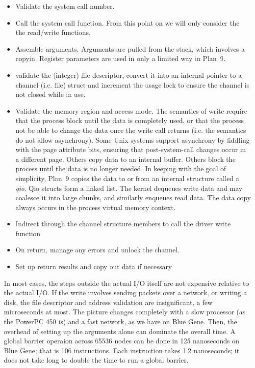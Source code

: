 \documentclass[a4,10pt,preprint]{sigplanconf}
\begin{document}
\begin{itemize}
\item Validate the system call number.
\item Call the system call function. From this point on we will only consider the the read/write functions. 
\item Assemble arguments. Arguments are pulled from the stack, which involves a copyin. Register parameters are used in only a limited way in Plan~9. 
\item validate the (integer) file descriptor, convert it into an internal pointer to a channel (i.e. file) struct and increment the usage lock to ensure the channel is not closed while in use. 
\item Validate the memory region and access mode. The semantics of write require that the process block 
until the data is completely used, or that the process not be able to change the data once the write call returns (i.e. 
the semantics do not allow asynchrony). Some Unix systems support asynchrony by fiddling with the 
page attribute bits, ensuring that post-system-call changes occur in a different page. Others copy data to an internal buffer. Others block the process until the data is no longer needed. 
In keeping with the goal of simplicity, Plan~9 copies the data to or from an internal structure called a {\em qio}. Qio structs form a linked list. The kernel dequeues write data and may coalesce it into large chunks, and similarly enqueues read data. The data copy always occurs in the process virtual memory context. 
\item Indirect through the channel structure members to call the driver write function
\item On return, manage any errors and unlock the channel. 
\item Set up return results and copy out data if necessary
\end{itemize}

In most cases, the steps outside the actual I/O itself are not expensive relative to the actual I/O. If the write involves
sending packets over a network, or writing a disk, the file descriptor and address validation are insignificant, a few microseconds at most. The picture changes completely with a slow processor (as the PowerPC 450 is) and a fast network, as we have on Blue Gene. Then, the overhead of setting up the arguments alone can dominate the overall time. A global barrier operaion across 65536 nodes can be done in 125 nanoseconds 
on Blue Gene; that is 106 instructions. Each instruction takes 1.2 nanoseconds; it does not take long to double the time to run a global barrier. 
\end{document}
